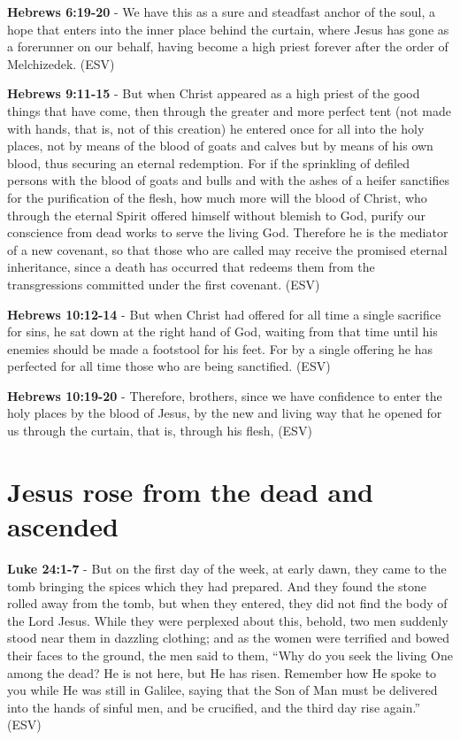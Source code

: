 \documentclass[11pt]{article}
\begin{document}
\textbf{Hebrews 6:19-20} - We have this as a sure and steadfast anchor of the soul, a hope that enters into the inner place behind the curtain, where Jesus has gone as a forerunner on our behalf, having become a high priest forever after the order of Melchizedek. (ESV)

\textbf{Hebrews 9:11-15} - But when Christ appeared as a high priest of the good things that have come, then through the greater and more perfect tent (not made with hands, that is, not of this creation) he entered once for all into the holy places, not by means of the blood of goats and calves but by means of his own blood, thus securing an eternal redemption. For if the sprinkling of defiled persons with the blood of goats and bulls and with the ashes of a heifer sanctifies for the purification of the flesh, how much more will the blood of Christ, who through the eternal Spirit offered himself without blemish to God, purify our conscience from dead works to serve the living God. Therefore he is the mediator of a new covenant, so that those who are called may receive the promised eternal inheritance, since a death has occurred that redeems them from the transgressions committed under the first covenant. (ESV)

\textbf{Hebrews 10:12-14} - But when Christ had offered for all time a single sacrifice for sins, he sat down at the right hand of God, waiting from that time until his enemies should be made a footstool for his feet. For by a single offering he has perfected for all time those who are being sanctified. (ESV)

\textbf{Hebrews 10:19-20} - Therefore, brothers, since we have confidence to enter the holy places by the blood of Jesus, by the new and living way that he opened for us through the curtain, that is, through his flesh, (ESV)

\section{Jesus rose from the dead and ascended}
\label{sec:orgf9a8835}
\textbf{Luke 24:1-7} - But on the first day of the week, at early dawn, they came to the tomb bringing the spices which they had prepared. And they found the stone rolled away from the tomb, but when they entered, they did not find the body of the Lord Jesus. While they were perplexed about this, behold, two men suddenly stood near them in dazzling clothing; and as the women were terrified and bowed their faces to the ground, the men said to them, “Why do you seek the living One among the dead? He is not here, but He has risen. Remember how He spoke to you while He was still in Galilee, saying that the Son of Man must be delivered into the hands of sinful men, and be crucified, and the third day rise again.” (ESV)
\end{document}
